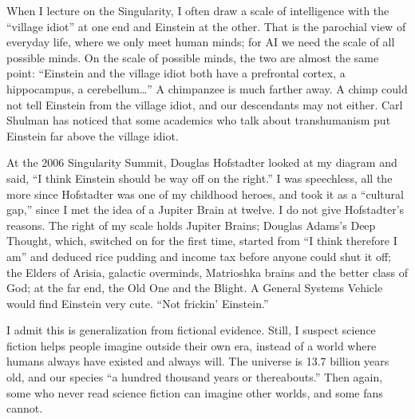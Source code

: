 
When I lecture on the Singularity, I often draw a scale of intelligence with the ``village idiot'' at one end and Einstein at the other. That is the parochial view of everyday life, where we only meet human minds; for AI we need the scale of all possible minds. On the scale of possible minds, the two are almost the same point: ``Einstein and the village idiot both have a prefrontal cortex, a hippocampus, a cerebellum\ldots'' A chimpanzee is much farther away. A chimp could not tell Einstein from the village idiot, and our descendants may not either. Carl Shulman has noticed that some academics who talk about transhumanism put Einstein far above the village idiot. 

At the 2006 Singularity Summit, Douglas Hofstadter looked at my diagram and said, ``I think Einstein should be way off on the right.'' I was speechless, all the more since Hofstadter was one of my childhood heroes, and took it as a ``cultural gap,'' since I met the idea of a Jupiter Brain at twelve. I do not give Hofstadter's reasons. The right of my scale holds Jupiter Brains; Douglas Adams's Deep Thought, which, switched on for the first time, started from ``I think therefore I am'' and deduced rice pudding and income tax before anyone could shut it off; the Elders of Arisia, galactic overminds, Matrioshka brains and the better class of God; at the far end, the Old One and the Blight. A General Systems Vehicle would find Einstein very cute. ``Not frickin' Einstein.''

I admit this is generalization from fictional evidence. Still, I suspect science fiction helps people imagine outside their own era, instead of a world where humans always have existed and always will.  The universe is 13.7 billion years old, and our species ``a hundred thousand years or thereabouts.''  Then again, some who never read science fiction can imagine other worlds, and some fans cannot.

